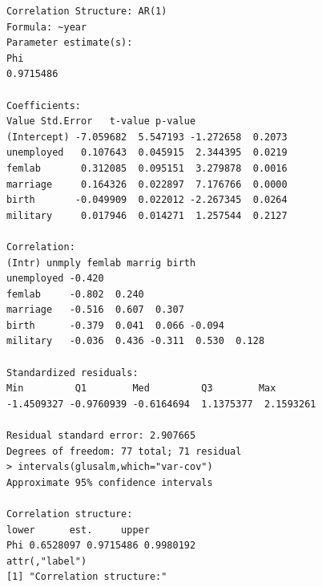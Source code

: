 \documentclass[11pt]{article}
\begin{document}
\begin{enumerate}
\begin{enumerate}
\begin{enumerate}
\begin{verbatim}
			Correlation Structure: AR(1)
			Formula: ~year 
			Parameter estimate(s):
			Phi 
			0.9715486 
			
			Coefficients:
			Value Std.Error   t-value p-value
			(Intercept) -7.059682  5.547193 -1.272658  0.2073
			unemployed   0.107643  0.045915  2.344395  0.0219
			femlab       0.312085  0.095151  3.279878  0.0016
			marriage     0.164326  0.022897  7.176766  0.0000
			birth       -0.049909  0.022012 -2.267345  0.0264
			military     0.017946  0.014271  1.257544  0.2127
			
			Correlation: 
			(Intr) unmply femlab marrig birth 
			unemployed -0.420                            
			femlab     -0.802  0.240                     
			marriage   -0.516  0.607  0.307              
			birth      -0.379  0.041  0.066 -0.094       
			military   -0.036  0.436 -0.311  0.530  0.128
			
			Standardized residuals:
			Min         Q1        Med         Q3        Max 
			-1.4509327 -0.9760939 -0.6164694  1.1375377  2.1593261 
			
			Residual standard error: 2.907665 
			Degrees of freedom: 77 total; 71 residual
			> intervals(glusalm,which="var-cov")
			Approximate 95% confidence intervals
			
			Correlation structure:
			lower      est.     upper
			Phi 0.6528097 0.9715486 0.9980192
			attr(,"label")
			[1] "Correlation structure:"
			

\end{verbatim}
\end{enumerate}
\end{enumerate}
\end{enumerate}
\end{document}
